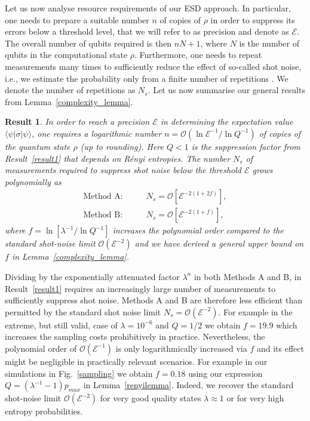 \documentclass[aps,prx,showpacs,twocolumn,reprint]{revtex4-2}
\newtheorem{result}{Result}
\begin{document}
Let us now analyse resource requirements of
our ESD approach.
In particular, one needs to prepare a suitable number $n$ of
copies of $\rho$ in order to suppress its errors below a threshold level,
that we will refer to as precision and denote as $\mathcal{E}$.
The overall number of qubits required is then $n N+1$, where $N$
is the number of qubits in the computational state $\rho$.
Furthermore, one needs to repeat measurements many times to sufficiently reduce the
effect of so-called shot noise, i.e., we estimate the probability only from a finite
number of repetitions \cite{van2020measurement}. We denote the number of repetitions
as $N_s$.
Let us now summarise our general results
from Lemma~\ref{complexity_lemma}.
\begin{result}\label{result3}
	In order to reach a precision $\mathcal{E}$ in determining 
	the expectation value $\langle\psi |\sigma | \psi \rangle$, one
	requires a logarithmic number
	$n= \mathcal{O}(\ln\mathcal{E}^{-1}/\ln Q^{-1})$ of
	copies of the quantum state $\rho$ (up to rounding).
	Here $Q<1$ is the suppression factor from Result~\ref{result1}
	that depends on R{\'e}nyi entropies.
	The number $N_{s}$ of measurements required to suppress shot
	noise below
	the threshold $\mathcal{E}$ grows polynomially as
	\begin{align*}
	\text{Method A:}& \quad \quad N_{s} = \mathcal{O}[ \mathcal{E}^{-2 (1+2f) } ], \\
	\text{Method B:}& \quad \quad N_{s} = \mathcal{O}[ \mathcal{E}^{-2 (1+f) } ],
	\end{align*}	
	where $f = \ln [\lambda^{-1} /\ln Q^{-1}]$ increases the polynomial
	order compared to the standard shot-noise limit $\mathcal{O}(\mathcal{E}^{-2})$
	and we have derived a general upper bound on $f$ in Lemma~\ref{complexity_lemma}. 
\end{result}


Dividing by the exponentially attenuated factor $\lambda^n$ in both Methods A and B,
in Result~\ref{result1} requires an increasingly large number of measurements
to sufficiently suppress shot noise. Methods A and B are therefore less efficient than
permitted by the standard shot noise limit $N_s = \mathcal{O}(\mathcal{E}^{-2})$.
For example in the extreme, but still valid, case of $\lambda = 10^{-6}$
and $Q=1/2$ we obtain $f = 19.9$ which increases the sampling costs prohibitively in practice.
Nevertheless, the polynomial order of $\mathcal{O}(\mathcal{E}^{-1})$ is only
logarithmically increased via $f$ and its effect might be negligible in
practically relevant scenarios. For example in our simulations in Fig.~\ref{sampling} we
obtain $f =  0.18$ using our expression $Q = (\lambda^{-1}{-}1) p_{max}$ in Lemma~\ref{renyilemma}.
Indeed, we recover the standard shot-noise limit $\mathcal{O}(\mathcal{E}^{-2})$
for very good quality states $\lambda \approx 1$ or for very high entropy probabilities.
\end{document}
